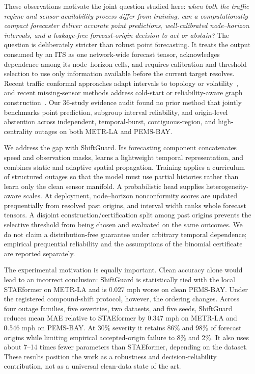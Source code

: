 \documentclass[pdflatex,sn-mathphys-num]{sn-jnl}
\begin{document}
These observations motivate the joint question studied here: \emph{when both
the traffic regime and sensor-availability process differ from training, can a
computationally compact forecaster deliver accurate point predictions,
well-calibrated node--horizon intervals, and a leakage-free forecast-origin
decision to act or abstain?} The question is deliberately stricter than robust
point forecasting. It treats the output consumed by an ITS as one network-wide
forecast tensor, acknowledges dependence among its node--horizon cells, and
requires calibration and threshold selection to use only information available
before the current target resolves. Recent traffic conformal approaches adapt
intervals to topology or volatility~\cite{patil2024conformal,wang2026csth}, and
recent missing-sensor methods address cold-start or reliability-aware graph
construction~\cite{wang2026scsamg,wu2026cast}. Our 36-study evidence audit found
no prior method that jointly benchmarks point prediction, subgroup interval
reliability, and origin-level abstention across independent, temporal-burst,
contiguous-region, and high-centrality outages on both METR-LA and PEMS-BAY.

We address the gap with ShiftGuard. Its forecasting component concatenates
speed and observation masks, learns a lightweight temporal representation, and
combines static and adaptive spatial propagation. Training applies a curriculum
of structured outages so that the model must use partial histories rather than
learn only the clean sensor manifold. A probabilistic head supplies
heterogeneity-aware scales. At deployment, node--horizon nonconformity scores
are updated prequentially from resolved past origins, and interval width ranks
whole forecast tensors. A disjoint construction/certification split among past
origins prevents the selective threshold from being chosen and evaluated on
the same outcomes. We do not claim a distribution-free guarantee under
arbitrary temporal dependence; empirical prequential reliability and the
assumptions of the binomial certificate are reported separately.

The experimental motivation is equally important. Clean accuracy alone would
lead to an incorrect conclusion: ShiftGuard is statistically tied with the
local STAEformer on METR-LA and is 0.027 mph worse on clean PEMS-BAY. Under the
registered compound-shift protocol, however, the ordering changes. Across four
outage families, five severities, two datasets, and five seeds, ShiftGuard
reduces mean MAE relative to STAEformer by 0.347 mph on METR-LA and 0.546 mph on
PEMS-BAY. At 30\% severity it retains 86\% and 98\% of forecast origins while
limiting empirical accepted-origin failure to 8\% and 2\%. It also uses about
7--14 times fewer parameters than STAEformer, depending on the dataset. These
results position the work as a robustness and decision-reliability
contribution, not as a universal clean-data state of the art.
\end{document}
